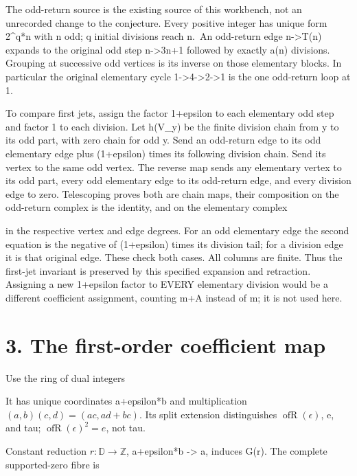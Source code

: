 The odd-return source is the existing source of this workbench, not an
unrecorded change to the conjecture. Every positive integer has unique
form 2\^{}q*n with n odd; q initial divisions reach n.~An odd-return
edge n-\textgreater T(n) expands to the original odd step
n-\textgreater3n+1 followed by exactly a(n) divisions. Grouping at
successive odd vertices is its inverse on those elementary blocks. In
particular the original elementary cycle
1-\textgreater4-\textgreater2-\textgreater1 is the one odd-return loop
at 1.

To compare first jets, assign the factor 1+epsilon to each elementary
odd step and factor 1 to each division. Let h(V\_y) be the finite
division chain from y to its odd part, with zero chain for odd y. Send
an odd-return edge to its odd elementary edge plus (1+epsilon) times its
following division chain. Send its vertex to the same odd vertex. The
reverse map sends any elementary vertex to its odd part, every odd
elementary edge to its odd-return edge, and every division edge to zero.
Telescoping proves both are chain maps, their composition on the
odd-return complex is the identity, and on the elementary complex


in the respective vertex and edge degrees. For an odd elementary edge
the second equation is the negative of (1+epsilon) times its division
tail; for a division edge it is that original edge. These check both
cases. All columns are finite. Thus the first-jet invariant is preserved
by this specified expansion and retraction. Assigning a new 1+epsilon
factor to EVERY elementary division would be a different coefficient
assignment, counting m+A instead of m; it is not used here.

\section{3. The first-order coefficient map}

Use the ring of dual integers


It has unique coordinates a+epsilon*b and multiplication
\((a,b)(c,d)=(ac,ad+bc)\). Its split extension distinguishes
\(\operatorname{ofR}(\epsilon)\), e, and tau;
\(\operatorname{ofR}(\epsilon)^2=e\), not tau.

Constant reduction \(r:\mathbb D\to\mathbb Z\), a+epsilon*b
-\textgreater{} a, induces G(r). The complete supported-zero fibre is

